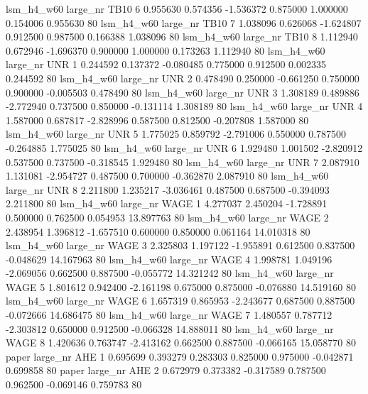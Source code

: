   lsm_h4_w60   large_nr     TB10                 6  0.955630  0.574356  -1.536372 0.875000 1.000000  0.154006    0.955630 80
  lsm_h4_w60   large_nr     TB10                 7  1.038096  0.626068  -1.624807 0.912500 0.987500  0.166388    1.038096 80
  lsm_h4_w60   large_nr     TB10                 8  1.112940  0.672946  -1.696370 0.900000 1.000000  0.173263    1.112940 80
  lsm_h4_w60   large_nr      UNR                 1  0.244592  0.137372  -0.080485 0.775000 0.912500  0.002335    0.244592 80
  lsm_h4_w60   large_nr      UNR                 2  0.478490  0.250000  -0.661250 0.750000 0.900000 -0.005503    0.478490 80
  lsm_h4_w60   large_nr      UNR                 3  1.308189  0.489886  -2.772940 0.737500 0.850000 -0.131114    1.308189 80
  lsm_h4_w60   large_nr      UNR                 4  1.587000  0.687817  -2.828996 0.587500 0.812500 -0.207808    1.587000 80
  lsm_h4_w60   large_nr      UNR                 5  1.775025  0.859792  -2.791006 0.550000 0.787500 -0.264885    1.775025 80
  lsm_h4_w60   large_nr      UNR                 6  1.929480  1.001502  -2.820912 0.537500 0.737500 -0.318545    1.929480 80
  lsm_h4_w60   large_nr      UNR                 7  2.087910  1.131081  -2.954727 0.487500 0.700000 -0.362870    2.087910 80
  lsm_h4_w60   large_nr      UNR                 8  2.211800  1.235217  -3.036461 0.487500 0.687500 -0.394093    2.211800 80
  lsm_h4_w60   large_nr     WAGE                 1  4.277037  2.450204  -1.728891 0.500000 0.762500  0.054953   13.897763 80
  lsm_h4_w60   large_nr     WAGE                 2  2.438954  1.396812  -1.657510 0.600000 0.850000  0.061164   14.010318 80
  lsm_h4_w60   large_nr     WAGE                 3  2.325803  1.197122  -1.955891 0.612500 0.837500 -0.048629   14.167963 80
  lsm_h4_w60   large_nr     WAGE                 4  1.998781  1.049196  -2.069056 0.662500 0.887500 -0.055772   14.321242 80
  lsm_h4_w60   large_nr     WAGE                 5  1.801612  0.942400  -2.161198 0.675000 0.875000 -0.076880   14.519160 80
  lsm_h4_w60   large_nr     WAGE                 6  1.657319  0.865953  -2.243677 0.687500 0.887500 -0.072666   14.686475 80
  lsm_h4_w60   large_nr     WAGE                 7  1.480557  0.787712  -2.303812 0.650000 0.912500 -0.066328   14.888011 80
  lsm_h4_w60   large_nr     WAGE                 8  1.420636  0.763747  -2.413162 0.662500 0.887500 -0.066165   15.058770 80
       paper   large_nr      AHE                 1  0.695699  0.393279   0.283303 0.825000 0.975000 -0.042871    0.699858 80
       paper   large_nr      AHE                 2  0.672979  0.373382  -0.317589 0.787500 0.962500 -0.069146    0.759783 80
